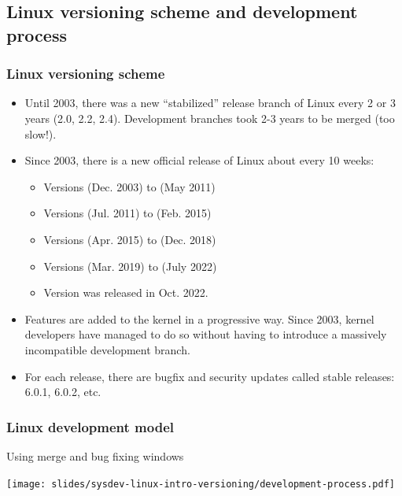\subsection{Linux versioning scheme and development process}

\begin{frame}
  \frametitle{Linux versioning scheme}
  \begin{itemize}
  \item Until 2003, there was a new ``stabilized'' release branch of Linux every
        2 or 3 years (2.0, 2.2, 2.4). Development branches took 2-3
        years to be merged (too slow!).
  \item Since 2003, there is a new official release of Linux about every
	10 weeks:
  \begin{itemize}
	\item Versions  (Dec. 2003) to  (May 2011)
	\item Versions  (Jul. 2011) to  (Feb. 2015)
	\item Versions  (Apr. 2015) to  (Dec. 2018)
	\item Versions  (Mar. 2019) to  (July 2022)
	\item Version  was released in Oct. 2022.
  \end{itemize}
  \item Features are added to the kernel in a progressive way. Since
        2003, kernel developers have managed to do so without having
        to introduce a massively incompatible development branch.
  \item For each release, there are bugfix and security updates called
    stable releases: 6.0.1, 6.0.2, etc.
  \end{itemize}
\end{frame}

\begin{frame}
  \frametitle{Linux development model}
  Using merge and bug fixing windows
  \begin{center}
    \texttt{[image: slides/sysdev-linux-intro-versioning/development-process.pdf]}
  \end{center}
\end{frame}

